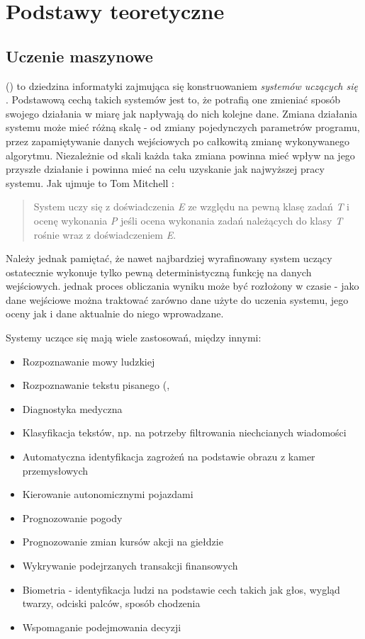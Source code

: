 \chapter{Podstawy teoretyczne}

\section{Uczenie maszynowe}
 () to dziedzina informatyki zajmująca się konstruowaniem \textit{systemów uczących się} \cite{krawiec2003uczenie}. Podstawową cechą takich systemów jest to, że potrafią one zmieniać sposób swojego działania w miarę jak napływają do nich kolejne dane. Zmiana działania systemu może mieć różną skalę - od zmiany pojedynczych parametrów programu, przez zapamiętywanie danych wejściowych po całkowitą zmianę wykonywanego algorytmu. Niezależnie od skali każda taka zmiana powinna mieć wpływ na jego przyszłe działanie i powinna mieć na celu uzyskanie jak najwyższej  pracy systemu. Jak ujmuje to Tom Mitchell \cite{Mitchell:1997:ML:541177}:
\begin{quote}
System uczy się z doświadczenia \textit{E} ze względu na pewną klasę zadań \textit{T} i ocenę wykonania \textit{P} jeśli ocena wykonania zadań należących do klasy \textit{T} rośnie wraz z doświadczeniem \textit{E}.
\end{quote}


Należy jednak pamiętać, że nawet najbardziej wyrafinowany system uczący ostatecznie wykonuje tylko pewną deterministyczną funkcję na danych wejściowych.  jednak proces obliczania wyniku może być rozłożony w czasie - jako dane wejściowe można traktować zarówno dane użyte do uczenia systemu, jego oceny jak i dane aktualnie do niego wprowadzane.

Systemy uczące się mają wiele zastosowań, między innymi:
\begin{itemize}
	\item Rozpoznawanie mowy ludzkiej
	\item Rozpoznawanie tekstu pisanego (, 
	\item Diagnostyka medyczna
	\item Klasyfikacja tekstów, np. na potrzeby filtrowania niechcianych wiadomości
	\item Automatyczna identyfikacja zagrożeń na podstawie obrazu z kamer przemysłowych
	\item Kierowanie autonomicznymi pojazdami
	\item Prognozowanie pogody
	\item Prognozowanie zmian kursów akcji na giełdzie
	\item Wykrywanie podejrzanych transakcji finansowych
	\item Biometria - identyfikacja ludzi na podstawie cech takich jak głos, wygląd twarzy, odciski palców, sposób chodzenia
	\item Wspomaganie podejmowania decyzji
\end{itemize}

